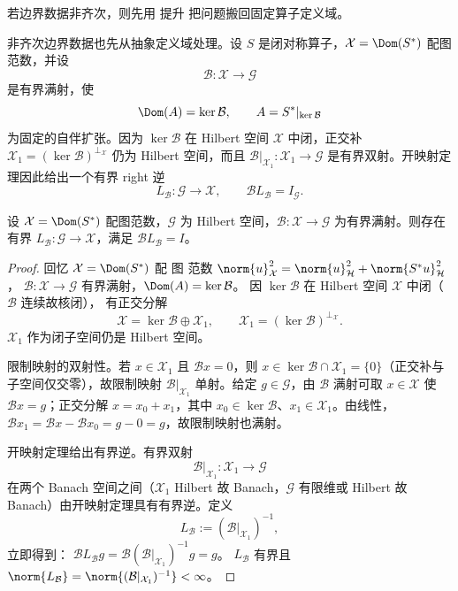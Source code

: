 若边界数据非齐次，则先用 提升 把问题搬回固定算子定义域。

非齐次边界数据也先从抽象定义域处理。设 $S$ 是闭对称算子，$\mathcal X=\Dom(S^*)$ 配图范数，并设
\[
 \mathcal B:\mathcal X\to\mathcal G
\]
是有界满射，使
\[
 \Dom(A)=\ker\mathcal B,
 \qquad A=S^*|_{\ker\mathcal B}
\]
为固定的自伴扩张。因为 $\ker\mathcal B$ 在 Hilbert 空间 $\mathcal X$ 中闭，正交补
$\mathcal X_1=(\ker\mathcal B)^{\perp_{\mathcal X}}$ 仍为 Hilbert 空间，而且
$\mathcal B|_{\mathcal X_1}:\mathcal X_1\to\mathcal G$ 是有界双射。开映射定理因此给出一个有界 right 逆
\begin{equation}\label{eq:math-sl-abstract-boundary-lifting}
 L_{\mathcal B}:\mathcal G\to\mathcal X,
 \qquad
 \mathcal B L_{\mathcal B}=I_{\mathcal G}.
\end{equation}

\begin{proposition}[满射边界映射的有界右逆]
设 $\mathcal X=\Dom(S^*)$ 配图范数，$\mathcal G$ 为 Hilbert 空间，$\mathcal B:\mathcal X\to\mathcal G$ 为有界满射。则存在有界 $L_{\mathcal B}:\mathcal G\to\mathcal X$，满足 $\mathcal B L_{\mathcal B}=I$。
\end{proposition}
\begin{proof}
回忆 $\mathcal X=\Dom(S^*)$ 配 图 范数
$\norm{u}_{\mathcal X}^2=\norm{u}_{\mathcal H}^2+\norm{S^*u}_{\mathcal H}^2$，
$\mathcal B:\mathcal X\to\mathcal G$ 有界满射，$\Dom(A)=\ker\mathcal B$。
因 $\ker\mathcal B$ 在 Hilbert 空间 $\mathcal X$ 中闭（$\mathcal B$ 连续故核闭），
有正交分解
\[
 \mathcal X=\ker\mathcal B\oplus\mathcal X_1,
 \qquad
 \mathcal X_1=(\ker\mathcal B)^{\perp_{\mathcal X}}.
\]
$\mathcal X_1$ 作为闭子空间仍是 Hilbert 空间。

限制映射的双射性。若 $x\in\mathcal X_1$ 且 $\mathcal Bx=0$，则
$x\in\ker\mathcal B\cap\mathcal X_1=\{0\}$（正交补与子空间仅交零），故限制映射
$\mathcal B|_{\mathcal X_1}$ 单射。给定 $g\in\mathcal G$，由 $\mathcal B$ 满射可取
$x\in\mathcal X$ 使 $\mathcal Bx=g$；正交分解 $x=x_0+x_1$，其中
$x_0\in\ker\mathcal B$、$x_1\in\mathcal X_1$。由线性，
$\mathcal Bx_1=\mathcal Bx-\mathcal Bx_0=g-0=g$，故限制映射也满射。

开映射定理给出有界逆。有界双射
\[
 \mathcal B|_{\mathcal X_1}:\mathcal X_1\to\mathcal G
\]
在两个 Banach 空间之间（$\mathcal X_1$ Hilbert 故 Banach，$\mathcal G$ 有限维或
Hilbert 故 Banach）由开映射定理具有有界逆。定义
\[
 L_{\mathcal B}:=(\mathcal B|_{\mathcal X_1})^{-1},
\]
立即得到：
$\mathcal BL_{\mathcal B}g=\mathcal B(\mathcal B|_{\mathcal X_1})^{-1}g=g$。
$L_{\mathcal B}$ 有界且 $\norm{L_{\mathcal B}}=\norm{(\mathcal B|_{\mathcal X_1})^{-1}}<\infty$。
\end{proof}

